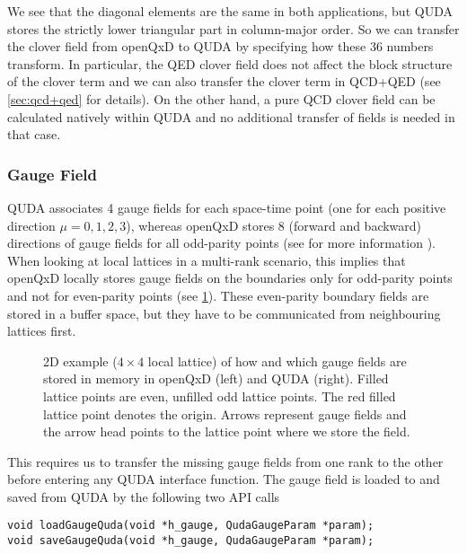 We see that the diagonal elements are the same in both applications, but QUDA stores the strictly lower triangular part in column-major order. 
So we can transfer the clover field from openQxD to QUDA by specifying how these 36 numbers transform. In particular, the QED
clover field does not affect the block structure of the clover term and we can also transfer the clover term in QCD+QED (see \cref{sec:qcd+qed}
for details).
On the other hand, a pure QCD clover field can be calculated natively within QUDA and no additional transfer of fields is needed in that case.

\subsubsection{Gauge Field}
    QUDA associates 4 gauge fields for each space-time point (one for each positive direction $\mu=0,1,2,3$), whereas openQxD stores $8$
    (forward and backward) directions of gauge fields for all odd-parity points (see  for more information \cite{openqxd}). When looking at local lattices in a multi-rank scenario, this implies that openQxD locally stores gauge fields on the boundaries only for odd-parity points and not for even-parity points (see \cref{fig:gauge}). These even-parity boundary fields are stored in a buffer space, but they have to be communicated from neighbouring lattices first.

\begin{figure}
  \caption{2D example ($4 \times 4$ local lattice) of how and which gauge fields are stored in memory in openQxD (left) and QUDA (right). Filled lattice points are even, unfilled odd lattice points. The red filled lattice point denotes the origin. Arrows represent gauge fields and the arrow head points to the lattice point where we store the field.}
  \label{fig:gauge}
\end{figure}

This requires us to transfer the missing gauge fields from one rank to the other before entering any QUDA interface function. The gauge field is loaded to and saved from QUDA by the following two API calls

\begin{verbatim}
void loadGaugeQuda(void *h_gauge, QudaGaugeParam *param);
void saveGaugeQuda(void *h_gauge, QudaGaugeParam *param);
\end{verbatim}

